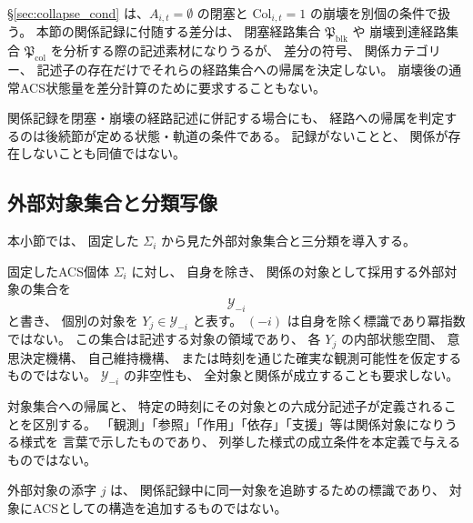 \begin{remark}[閉塞・崩壊の節との関係]
\label{rem:rel_to_sec7_intro}
\S\ref{sec:collapse_cond} は、$A_{i,t}=\emptyset$ の閉塞と
$\mathrm{Col}_{i,t}=1$ の崩壊を別個の条件で扱う。
本節の関係記録に付随する差分は、
閉塞経路集合 $\mathfrak{P}_{\mathrm{blk}}$ や
崩壊到達経路集合 $\mathfrak{P}_{\mathrm{col}}$ を分析する際の記述素材になりうるが、
差分の符号、
関係カテゴリー、
記述子の存在だけでそれらの経路集合への帰属を決定しない。
崩壊後の通常ACS状態量を差分計算のために要求することもない。

関係記録を閉塞・崩壊の経路記述に併記する場合にも、
経路への帰属を判定するのは後続節が定める状態・軌道の条件である。
記録がないことと、
関係が存在しないことも同値ではない。
\end{remark}

\subsection{外部対象集合と分類写像}
\label{subsec:rel_objects}

本小節では、
固定した $\Sigma_i$ から見た外部対象集合と三分類を導入する。

\begin{definition}[外部対象集合]
\label{def:external_object_set}
固定したACS個体 $\Sigma_i$ に対し、
自身を除き、
関係の対象として採用する外部対象の集合を
\[
  \mathcal Y_{-i}
\]
と書き、
個別の対象を $Y_j\in\mathcal Y_{-i}$ と表す。
$(-i)$ は自身を除く標識であり冪指数ではない。
この集合は記述する対象の領域であり、
各 $Y_j$ の内部状態空間、
意思決定機構、
自己維持機構、
または時刻を通じた確実な観測可能性を仮定するものではない。
$\mathcal Y_{-i}$ の非空性も、
全対象と関係が成立することも要求しない。

対象集合への帰属と、
特定の時刻にその対象との六成分記述子が定義されることを区別する。
「観測」「参照」「作用」「依存」「支援」等は関係対象になりうる様式を
言葉で示したものであり、
列挙した様式の成立条件を本定義で与えるものではない。

外部対象の添字 $j$ は、
関係記録中に同一対象を追跡するための標識であり、
対象にACSとしての構造を追加するものではない。
\end{definition}

